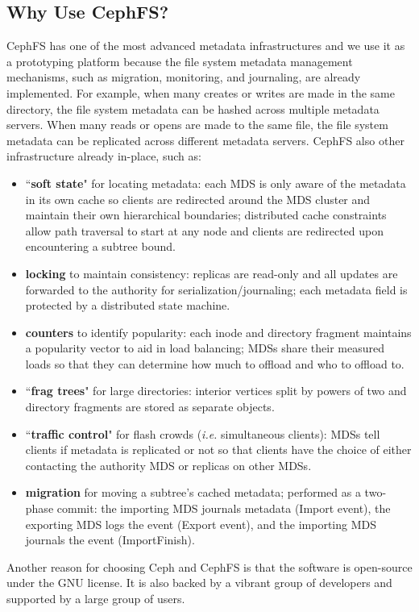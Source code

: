 \subsection*{Why Use CephFS?}
\label{background-why}

CephFS has one of the most advanced metadata infrastructures and we use it as a
prototyping platform because the file system metadata management mechanisms,
such as migration, monitoring, and journaling, are already implemented.  For
example, when many creates or writes are made in the same directory, the file
system metadata can be hashed across multiple metadata servers. When many reads
or opens are made to the same file, the file system metadata can be replicated
across different metadata servers. CephFS also other infrastructure already
in-place, such as: 

\begin{itemize}

\item ``\textbf{soft state}" for locating metadata: each MDS is only aware of
the metadata in its own cache so clients are redirected around the MDS cluster
and maintain their own hierarchical boundaries; distributed cache constraints
allow path traversal to start at any node and clients are redirected upon
encountering a subtree bound.

\item \textbf{locking} to maintain consistency: replicas are read-only and all
updates are forwarded to the authority for serialization/journaling; each
metadata field is protected by a distributed state machine.

\item \textbf{counters} to identify popularity: each inode and directory
fragment maintains a popularity vector to aid in load balancing; MDSs share
their measured loads so that they can determine how much to offload and who to
offload to.

\item ``\textbf{frag trees}" for large directories: interior vertices split by
powers of two and directory fragments are stored as separate objects.

\item ``\textbf{traffic control}" for flash crowds ({\it i.e.} simultaneous
clients): MDSs tell clients if metadata is replicated or not so that clients
have the choice of either contacting the authority MDS or replicas on other
MDSs.

\item \textbf{migration} for moving a subtree's cached metadata; performed
as a two-phase commit: the importing MDS journals metadata (Import event), the
exporting MDS logs the event (Export event), and the importing MDS journals the
event (ImportFinish). 

\end{itemize}

Another reason for choosing Ceph and CephFS is that the software is open-source
under the GNU license. It is also backed by a vibrant group of developers and
supported by a large group of users.
